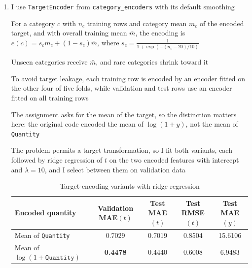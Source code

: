 \documentclass{article}
\begin{document}
\begin{enumerate}[label=\alph*.]
Only $0.085\%$ of test rows have a stock code unseen in training and $0.027\%$ an unseen customer

The random split lets the same (stock code, customer) pair occur across partitions, since $32.95\%$ of all rows repeat an earlier pair, so these results describe predicting further purchases by known customers and products rather than entirely new ones

Define $t_i=\log(1+y_i)$ to reduce the influence of extreme quantities; models are compared on test MAE of $t$, with RMSE of $t$ and the mean and median absolute error of $y$ alongside it

Predictions of $t$ are clipped to the feasible range $[\log 2,\max\limits_{i\in\mathrm{train}} t_i]$ before scoring

\item I use \texttt{TargetEncoder} from \texttt{category\_encoders} with its default smoothing

For a category $c$ with $n_c$ training rows and category mean $m_c$ of the encoded target, and with overall training mean $\bar m$, the encoding is $e(c)=s_c m_c+(1-s_c)\bar m$, where $s_c=\frac{1}{1+\exp(-(n_c-20)/10)}$

Unseen categories receive $\bar m$, and rare categories shrink toward it

To avoid target leakage, each training row is encoded by an encoder fitted on the other four of five folds, while validation and test rows use an encoder fitted on all training rows

The assignment asks for the mean of the target, so the distinction matters here: the original code encoded the mean of $\log(1+y)$, not the mean of \texttt{Quantity}

The problem permits a target transformation, so I fit both variants, each followed by ridge regression of $t$ on the two encoded features with intercept and $\lambda=10$, and I select between them on validation data

\begin{table}[H]
\centering
\begin{tabular}{lcccc}
\toprule
Encoded quantity & Validation MAE$(t)$ & Test MAE$(t)$ & Test RMSE$(t)$ & Test MAE$(y)$ \\
\midrule
Mean of \texttt{Quantity} & 0.7029 & 0.7019 & 0.8504 & 15.6106 \\
Mean of $\log(1+\texttt{Quantity})$ & \textbf{0.4478} & 0.4440 & 0.6008 & 6.9483 \\
\bottomrule
\end{tabular}
\caption{Target-encoding variants with ridge regression}
\end{table}


\end{enumerate}
\end{document}
